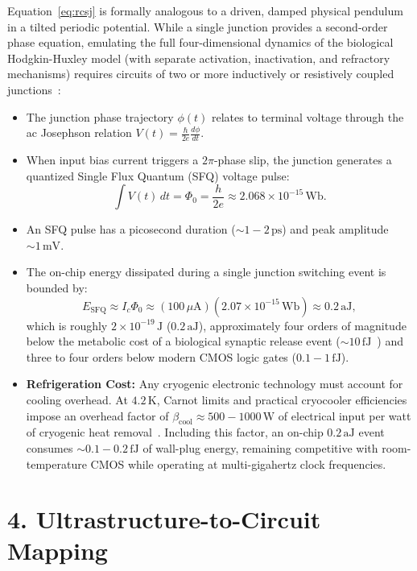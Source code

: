 \documentclass[10pt,twocolumn,letterpaper]{article}
\begin{document}
Equation~\ref{eq:rcsj} is formally analogous to a driven, damped physical pendulum in a tilted periodic potential. While a single junction provides a second-order phase equation, emulating the full four-dimensional dynamics of the biological Hodgkin-Huxley model (with separate activation, inactivation, and refractory mechanisms) requires circuits of two or more inductively or resistively coupled junctions~\cite{crotty2010josephson}:
\begin{itemize}
  \item The junction phase trajectory $\phi(t)$ relates to terminal voltage through the ac Josephson relation $V(t) = \frac{\hbar}{2e} \frac{d\phi}{dt}$.
  \item When input bias current triggers a $2\pi$-phase slip, the junction generates a quantized Single Flux Quantum (SFQ) voltage pulse:
  \begin{equation}
    \int V(t)\,dt = \Phi_0 = \frac{h}{2e} \approx 2.068 \times 10^{-15}\,\text{Wb}.
  \end{equation}
  \item An SFQ pulse has a picosecond duration ($\sim 1 - 2\,\text{ps}$) and peak amplitude $\sim 1\,\text{mV}$.
  \item The on-chip energy dissipated during a single junction switching event is bounded by:
  \begin{equation}
    E_{\text{SFQ}} \approx I_c \Phi_0 \approx (100\,\mu\text{A})(2.07 \times 10^{-15}\,\text{Wb}) \approx 0.2\,\text{aJ},
  \end{equation}
  which is roughly $2 \times 10^{-19}\,\text{J}$ ($0.2\,\text{aJ}$), approximately four orders of magnitude below the metabolic cost of a biological synaptic release event ($\sim 10\,\text{fJ}$~\cite{attwell2001energy}) and three to four orders below modern CMOS logic gates ($0.1 - 1\,\text{fJ}$).
  \item \textbf{Refrigeration Cost:} Any cryogenic electronic technology must account for cooling overhead. At $4.2\,\text{K}$, Carnot limits and practical cryocooler efficiencies impose an overhead factor of $\beta_{\text{cool}} \approx 500 - 1000\,\text{W}$ of electrical input per watt of cryogenic heat removal~\cite{holmes2013energy}. Including this factor, an on-chip $0.2\,\text{aJ}$ event consumes $\sim 0.1 - 0.2\,\text{fJ}$ of wall-plug energy, remaining competitive with room-temperature CMOS while operating at multi-gigahertz clock frequencies.
\end{itemize}

\section*{4. Ultrastructure-to-Circuit Mapping}
\end{document}
